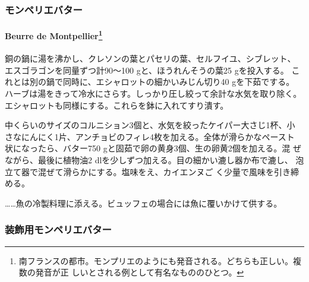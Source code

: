 \begin{recette}
\maeaki

\hypertarget{ux30e2ux30f3ux30daux30eaux30a8ux30d0ux30bfux30fc}{%
\subsubsection{モンペリエバター}\label{ux30e2ux30f3ux30daux30eaux30a8ux30d0ux30bfux30fc}}

\hypertarget{beurre-de-montpellier}{%
\paragraph[Beurre de Montpellier]{\texorpdfstring{Beurre de
Montpellier\footnote{南フランスの都市。モンプリエのようにも発音される。どちらも正しい。複数の発音が正
  しいとされる例として有名なもののひとつ。}}{Beurre de Montpellier}}\label{beurre-de-montpellier}}


銅の鍋に湯を沸かし、クレソンの葉とパセリの葉、セルフイユ、シブレット、
エスゴラゴンを同量ずつ計90〜100 gと、ほうれんそうの葉25 gを投入する。
これとは別の鍋で同時に、エシャロットの細かいみじん切り40 gを下茹でする。
ハーブは湯をきって冷水にさらす。しっかり圧し絞って余計な水気を取り除く。
エシャロットも同様にする。これらを鉢に入れてすり潰す。

中くらいのサイズのコルニション3個と、水気を絞ったケイパー大さじ1杯、小
さなにんにく1片、アンチョビのフィレ4枚を加える。全体が滑らかなペースト
状になったら、バター750 gと固茹で卵の黄身3個、生の卵黄2個を加える。混
ぜながら、最後に植物油2 dlを少しずつ加える。目の細かい漉し器か布で漉し、
泡立て器で混ぜて滑らかにする。塩味をえ、カイエンヌご
く少量で風味を引き締める。

\ldots{}\ldots{}魚の冷製料理に添える。ビュッフェの場合には魚に覆いかけて供する。

\maeaki

\hypertarget{ux88c5ux98feux7528ux30e2ux30f3ux30daux30eaux30a8ux30d0ux30bfux30fc}{%
\subsubsection{装飾用モンペリエバター}\label{ux88c5ux98feux7528ux30e2ux30f3ux30daux30eaux30a8ux30d0ux30bfux30fc}}


\end{recette}
